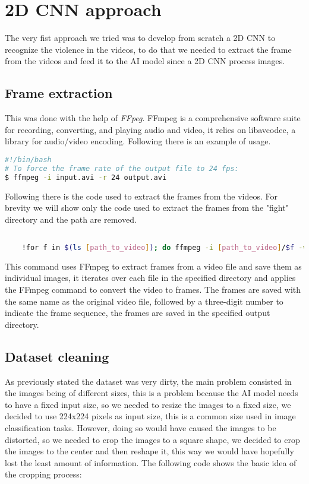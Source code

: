 \chapter{2D CNN approach}
The very fist approach we tried was to develop from scratch a 2D CNN to recognize the violence in the videos, to do that we needed to extract the frame from the videos and feed it to the AI model since a 2D CNN process images.
\section{Frame extraction}
This was done with the help of \textit{FFpeg}. FFmpeg is a comprehensive software suite for recording, converting, and playing audio and video, it relies on libavcodec, a library for audio/video encoding. Following there is an example of usage.
\begin{lstlisting}[language=bash, caption={FFpeg example}, label={lst:FFpegExample}]
#!/bin/bash
# To force the frame rate of the output file to 24 fps:
$ ffmpeg -i input.avi -r 24 output.avi

\end{lstlisting}

Following there is the code used to extract the frames from the videos. For brevity we will show only the code used to extract the frames from the "fight" directory and the path are removed.
\begin{lstlisting}[language=bash, caption={Frame extraction}, label={lst:FrameExtraction}]

    !for f in $(ls [path_to_video]); do ffmpeg -i [path_to_video]/$f -vf fps=5 [path_to_frame]/${f%.*}-%03d.png; done;
\end{lstlisting}

This command uses FFmpeg to extract frames from a video file and save them as individual images, it iterates over each file in the specified directory and applies the FFmpeg command to convert the video to frames. The frames are saved with the same name as the original video file, followed by a three-digit number to indicate the frame sequence, the frames are saved in the specified output directory.

\section{Dataset cleaning}
As previously stated the dataset was very dirty, the main problem consisted in the images being of different sizes, this is a problem because the AI model needs to have a fixed input size, so we needed to resize the images to a fixed size, we decided to use 224x224 pixels as input size, this is a common size used in image classification tasks. However, doing so would have caused the images to be distorted, so we needed to crop the images to a square shape, we decided to crop the images to the center and then reshape it, this way we would have hopefully lost the least amount of information. The following code shows the basic idea of the cropping process:

